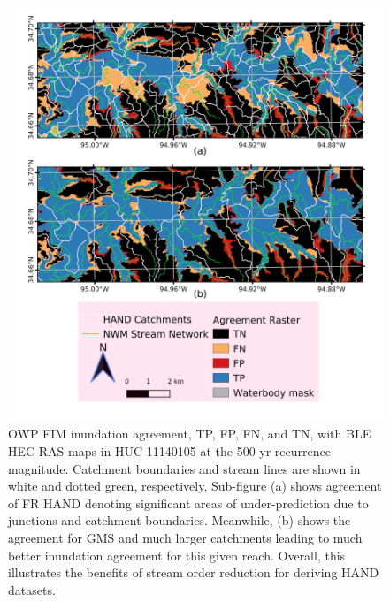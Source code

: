 %
%
\begin{figure}[H]
\centering
\includegraphics[scale=1.0]{figures/gms_enhancement.jpg}
\caption{OWP FIM inundation agreement, TP, FP, FN, and TN, with BLE HEC-RAS maps in HUC 11140105 at the 500 yr recurrence magnitude.
Catchment boundaries and stream lines are shown in white and dotted green, respectively.
Sub-figure (a) shows agreement of FR HAND denoting significant areas of under-prediction due to junctions and catchment boundaries.
Meanwhile, (b) shows the agreement for GMS and much larger catchments leading to much better inundation agreement for this given reach. 
Overall, this illustrates the benefits of stream order reduction for deriving HAND datasets.
}
\label{fig:gms_enhancement}
\end{figure}
%
